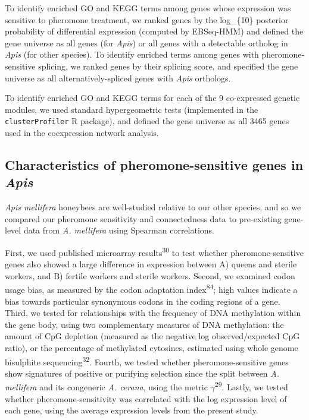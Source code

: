 \documentclass[12pt,]{article}
\begin{document}
To identify enriched GO and KEGG terms among genes whose expression was
sensitive to pheromone treatment, we ranked genes by the log\_\{10\}
posterior probability of differential expression (computed by EBSeq-HMM)
and defined the gene universe as all genes (for \emph{Apis}) or all
genes with a detectable ortholog in \emph{Apis} (for other species). To
identify enriched terms among genes with pheromone-sensitive splicing,
we ranked genes by their splicing score, and specified the gene universe
as all alternatively-spliced genes with \emph{Apis} orthologs.

To identify enriched GO and KEGG terms for each of the 9 co-expressed
genetic modules, we used standard hypergeometric tests (implemented in
the \texttt{clusterProfiler} R package), and defined the gene universe
as all 3465 genes used in the coexpression network analysis.

\subsection{\texorpdfstring{Characteristics of pheromone-sensitive genes
in
\emph{Apis}}{Characteristics of pheromone-sensitive genes in Apis}}\label{characteristics-of-pheromone-sensitive-genes-in-apis}

\emph{Apis mellifera} honeybees are well-studied relative to our other
species, and so we compared our pheromone sensitivity and connectedness
data to pre-existing gene-level data from \emph{A. mellifera} using
Spearman correlations.

First, we used published microarray results\textsuperscript{30} to test
whether pheromone-sensitive genes also showed a large difference in
expression between A) queens and sterile workers, and B) fertile workers
and sterile workers. Second, we examined codon usage bias, as measured
by the codon adaptation index\textsuperscript{84}; high values indicate
a bias towards particular synonymous codons in the coding regions of a
gene. Third, we tested for relationships with the frequency of DNA
methylation within the gene body, using two complementary measures of
DNA methylation: the amount of CpG depletion (measured as the negative
log observed/expected CpG ratio), or the percentage of methylated
cytosines, estimated using whole genome bisulphite
sequencing\textsuperscript{32}. Fourth, we tested whether
pheromone-sensitive genes show signatures of positive or purifying
selection since the split between \emph{A. mellifera} and its congeneric
\emph{A. cerana}, using the metric \(\gamma\)\textsuperscript{29}.
Lastly, we tested whether pheromone-sensitivity was correlated with the
log expression level of each gene, using the average expression levels
from the present study.
\end{document}
